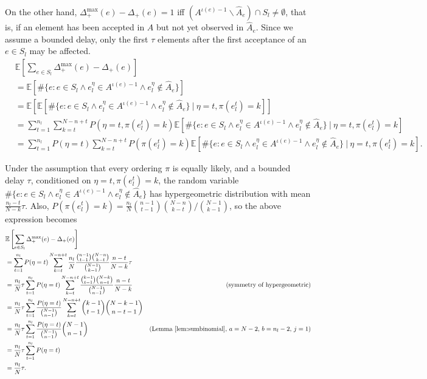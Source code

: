 On the other hand, $\Delta_+^{\max}(e)-\Delta_+(e) = 1$ iff $(A^{\iota(e)-1}\backslash\hat{A}_e)\cap S_l \neq\emptyset$, that is, if an element has been accepted in $A$ but not yet observed in $\hat{A}_e$.
Since we assume a bounded delay, only the first $\tau$ elements after the first acceptance of an $e\in S_l$ may be affected.
\begin{align*}
&\mathbb{E}\left[\sum_{e\in S_l}\Delta_+^{\max}(e) - \Delta_+(e)\right]\\
&= \mathbb{E}[\#\{e: e \in S_l \wedge e_l^\eta \in A^{\iota(e)-1} \wedge e_l^\eta \not\in \hat{A}_e\}]\\
&= \mathbb{E}[\mathbb{E}[\#\{e: e \in S_l \wedge e_l^\eta \in A^{\iota(e)-1} \wedge e_l^\eta \not\in \hat{A}_e\} ~|~ \eta = t, \pi(e_l^t)=k]]\\
&= \sum_{t=1}^{n_l}\sum_{k=t}^{N-n+t} P(\eta=t, \pi(e_l^t)=k) \mathbb{E}[\#\{e: e \in S_l \wedge e_l^\eta \in A^{\iota(e)-1} \wedge e_l^\eta \not\in \hat{A}_e\} ~|~ \eta = t, \pi(e_l^t)=k]\\
&= \sum_{t=1}^{n_l} P(\eta=t) \sum_{k=t}^{N-n+t} P(\pi(e_l^t)=k) \mathbb{E}[\#\{e: e \in S_l \wedge e_l^\eta \in A^{\iota(e)-1} \wedge e_l^\eta \not\in \hat{A}_e\} ~|~ \eta = t, \pi(e_l^t)=k].
\end{align*}

Under the assumption that every ordering $\pi$ is equally likely, and a bounded delay $\tau$,
conditioned on $\eta = t, \pi(e_l^t)=k$, the random variable $\#\{e: e \in S_l \wedge e_l^\eta \in A^{\iota(e)-1} \wedge e_l^\eta \not\in \hat{A}_e\}$ has hypergeometric distribution with mean $\frac{n_l-t}{N-k}\tau$.
Also, $P(\pi(e_l^t) = k) = \frac{n_l}{N}{n-1 \choose t-1}{N-n \choose k-t} / {N-1 \choose k-1}$, so the above expression becomes
\begin{align*}
&\mathbb{E}\left[\sum_{e\in S_l}\Delta_+^{\max}(e) - \Delta_+(e)\right]\\
&= \sum_{t=1}^{n_l} P(\eta=t) \sum_{k=t}^{N-n+t} \frac{n_l}{N} \frac{{n-1 \choose t-1}{N-n \choose k-t}}{{N-1 \choose k-1}} \frac{n-t}{N-k} \tau\\
&= \frac{n_l}{N} \tau \sum_{t=1}^{n_l} P(\eta=t) \sum_{k=t}^{N-n+t} \frac{{k-1 \choose t-1}{N-k \choose n-t}}{{N-1 \choose n-1}} \frac{n-t}{N-k} & \text{(symmetry of hypergeometric)} \\
&= \frac{n_l}{N} \tau \sum_{t=1}^{n_l} \frac{P(\eta=t)}{{N-1 \choose n-1}} \sum_{k=t}^{N-n+t} {k-1 \choose t-1}{N-k-1 \choose n-t-1} \\
&= \frac{n_l}{N} \tau \sum_{t=1}^{n_l} \frac{P(\eta=t)}{{N-1 \choose n-1}} {N-1 \choose n-1} & \text{(Lemma \ref{lem:sumbinomial}, $a=N-2$, $b=n_l-2$, $j=1$)} \\
&= \frac{n_l}{N} \tau \sum_{t=1}^{n_l} P(\eta=t) \\
&= \frac{n_l}{N} \tau.
\end{align*}

